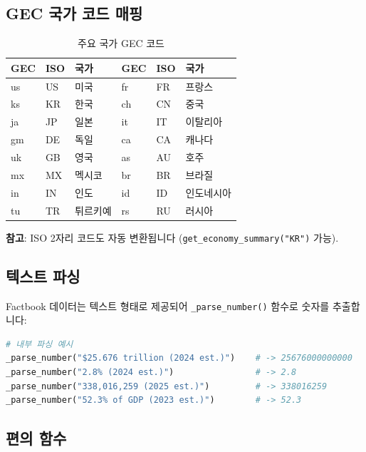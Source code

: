 \documentclass[11pt,a4paper]{article}
\newcommand{\code}[1]{\texttt{#1}}
\begin{document}
\subsection{GEC 국가 코드 매핑}

\begin{table}[h]
\centering
\caption{주요 국가 GEC 코드}
\begin{tabular}{l l l | l l l}
\toprule
\textbf{GEC} & \textbf{ISO} & \textbf{국가} & \textbf{GEC} & \textbf{ISO} & \textbf{국가} \\
\midrule
us & US & 미국     & fr & FR & 프랑스 \\
ks & KR & 한국     & ch & CN & 중국 \\
ja & JP & 일본     & it & IT & 이탈리아 \\
gm & DE & 독일     & ca & CA & 캐나다 \\
uk & GB & 영국     & as & AU & 호주 \\
mx & MX & 멕시코   & br & BR & 브라질 \\
in & IN & 인도     & id & ID & 인도네시아 \\
tu & TR & 튀르키예 & rs & RU & 러시아 \\
\bottomrule
\end{tabular}
\end{table}

\textbf{참고}: ISO 2자리 코드도 자동 변환됩니다 (\code{get\_economy\_summary("KR")} 가능).

\subsection{텍스트 파싱}

Factbook 데이터는 텍스트 형태로 제공되어 \code{\_parse\_number()} 함수로 숫자를 추출합니다:

\begin{lstlisting}[language=Python]
# 내부 파싱 예시
_parse_number("$25.676 trillion (2024 est.)")    # -> 25676000000000
_parse_number("2.8% (2024 est.)")                # -> 2.8
_parse_number("338,016,259 (2025 est.)")         # -> 338016259
_parse_number("52.3% of GDP (2023 est.)")        # -> 52.3
\end{lstlisting}

\subsection{편의 함수}
\end{document}
